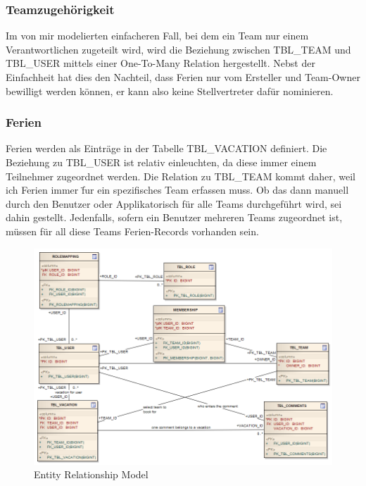 \subsubsection{Teamzugeh\"origkeit}
Im von mir modelierten einfacheren Fall, bei dem ein Team nur einem Verantwortlichen zugeteilt wird, wird die Beziehung zwischen TBL\_TEAM und TBL\_USER mittels einer One-To-Many Relation hergestellt. Nebst der Einfachheit hat dies den Nachteil, dass Ferien nur vom Ersteller und Team-Owner bewilligt werden k\"onnen, er kann also keine Stellvertreter daf\"ur nominieren. 

\subsubsection{Ferien}
Ferien werden als Eintr\"age in der Tabelle TBL\_VACATION definiert. Die Beziehung zu TBL\_USER ist relativ einleuchten, da diese immer einem Teilnehmer zugeordnet werden. Die Relation zu TBL\_TEAM kommt daher, weil ich Ferien immer \"fur ein spezifisches Team erfassen muss. Ob das dann manuell durch den Benutzer oder Applikatorisch f\"ur alle Teams durchgef\"uhrt wird, sei dahin gestellt. Jedenfalls, sofern ein Benutzer mehreren Teams zugeordnet ist, m\"ussen f\"ur all diese Teams Ferien-Records vorhanden sein.

\begin{landscape}
 \begin{figure}
  	\centering
    	\includegraphics[width=19cm]{images/erm}
        	\caption{Entity Relationship Model}
\end{figure}
\end{landscape}


